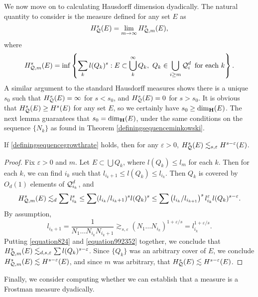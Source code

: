 We now move on to calculating Hausdorff dimension dyadically. The natural quantity to consider is the measure defined for any set $E$ as
%
\[ H^s_{\operatorname{\mathcal{Q}}}(E) = \lim_{m \to \infty} H^s_{\operatorname{\mathcal{Q}},m}(E), \]
%
where
%
\[ H^s_{\DQ,m}(E) = \inf \left\{ \sum_k l(Q_k)^s : E \subset \bigcup_k^\infty Q_k,\ Q_k \in \bigcup_{i \geq m} \DQ_i^d\ \text{for each $k$} \right\}. \]
%
A similar argument to the standard Hausdorff measures shows there is a unique $s_0$ such that $H^s_{\operatorname{\mathcal{Q}}}(E) = \infty$ for $s < s_0$, and $H^s_{\operatorname{\mathcal{Q}}}(E) = 0$ for $s > s_0$. It is obvious that $H^s_{\operatorname{\mathcal{Q}}}(E) \geq H^s(E)$ for any set $E$, so we certainly have $s_0 \geq \operatorname{\dim_{\mathbf{H}}}(E)$. The next lemma guarantees that $s_0 = \operatorname{\dim_{\mathbf{H}}}(E)$, under the same conditions on the sequence $\{ N_k \}$ as found in Theorem \ref{definingsequenceminkowski}.

\begin{lemma} \label{lemma51464}
	If \eqref{definingsequencegrowthrate} holds, then for any $\varepsilon > 0$, $H^s_{\operatorname{\mathcal{Q}}}(E) \lesssim_{s,\varepsilon} H^{s-\varepsilon}(E)$.
\end{lemma}
\begin{proof}
	Fix $\varepsilon > 0$ and $m$. Let $E \subset \bigcup Q_k$, where $l(Q_k) \leq l_m$ for each $k$. Then for each $k$, we can find $i_k$ such that $l_{i_k+1} \leq l(Q_k) \leq l_{i_k}$. Then $Q_k$ is covered by $O_d(1)$ elements of $\operatorname{\mathcal{Q}}_{i_k}^d$, and
	\begin{equation} \label{equation824} H^s_{\operatorname{\mathcal{Q}},m}(E) \lesssim_d \sum l_{i_k}^s \leq \sum (l_{i_k}/l_{i_k+1})^s l(Q_k)^s \leq \sum \left( l_{i_k}/l_{i_{k+1}} \right)^s l_{i_k}^\varepsilon l(Q_k)^{s - \varepsilon}. \end{equation}
	By assumption,
	\begin{equation} \label{equation992352}
		l_{i_k+1} = \frac{1}{N_1 \dots N_{i_k} N_{i_k+1}} \gtrsim_{s,\varepsilon} (N_1 \dots N_{i_k})^{1+ \varepsilon/s} = l_{i_k}^{1 + \varepsilon/s}.
	\end{equation}
	Putting \eqref{equation824} and \eqref{equation992352} together, we conclude that $H^s_{\operatorname{\mathcal{Q}},m}(E) \lesssim_{d,s,\varepsilon} \sum l(Q_k)^{s-\varepsilon}$. Since $\{ Q_k \}$ was an arbitrary cover of $E$, we conclude $H^s_{\operatorname{\mathcal{Q}},m}(E) \lesssim H^{s-\varepsilon}(E)$, and since $m$ was arbitrary, that $H^s_{\operatorname{\mathcal{Q}}}(E) \lesssim H^{s-\varepsilon}(E)$.
\end{proof}

Finally, we consider computing whether we can establish that a measure is a Frostman measure dyadically.

